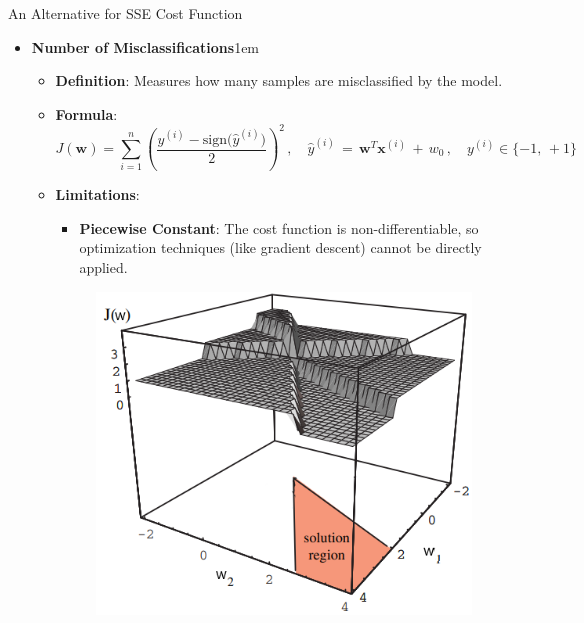 \documentclass[serif, aspectratio=169]{beamer}
\begin{document}
\begin{frame}{An Alternative for SSE Cost Function}
    \begin{itemize}
        \item \textbf{Number of Misclassifications}\itemsep1em
        \medskip
        \begin{itemize}\itemsep0.8em
            \item \textbf{Definition}:
            Measures how many samples are misclassified by the model.
            \item \textbf{Formula}:
                \[
                J(\mathbf{w}) = \sum_{i=1}^{n} (\frac{y^{(i)} - \text{sign(\(\hat{y}^{(i)})\)}}{2})^2 \, , \quad \hat{y}^{(i)} \, = \, \mathbf{w}^T\mathbf{x}^{(i)} \, + \, w_0 \, , \quad y^{(i)} \in \{-1, \, +1\}
                \]
            \item \textbf{Limitations}: \\
            \begin{itemize}
                \item \justifying \textbf{Piecewise Constant}:
                The cost function is non-differentiable, so optimization techniques (like gradient descent) cannot be directly applied.
            \end{itemize}
            \endminipage
            \hspace{1cm}
            \begin{figure}[bh]
                \includegraphics[width=\textwidth]{pic/Figure_12.png}
            \end{figure}
            \endminipage
        \end{itemize}
    \end{itemize}
    \vfill
\end{frame}
\end{document}
